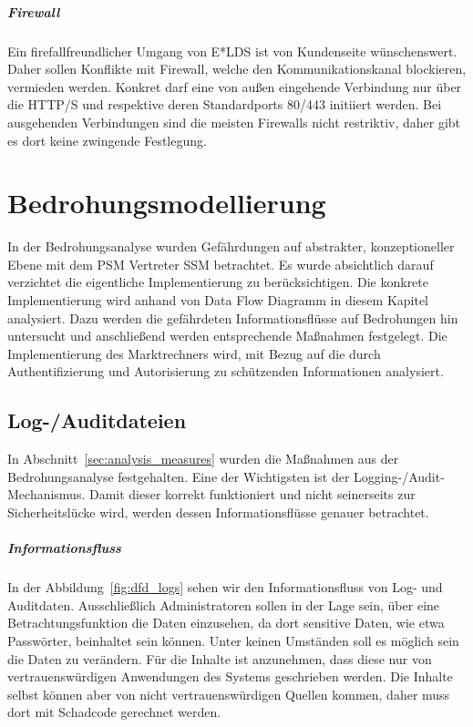 \documentclass[11pt,a4paper]{report}
\begin{document}
\paragraph{Firewall}
Ein firefallfreundlicher Umgang von E*LDS ist von Kundenseite wünschenswert. Daher sollen Konflikte mit Firewall, welche den Kommunikationskanal blockieren, vermieden werden. Konkret darf eine von außen eingehende Verbindung nur über die HTTP/S und respektive deren Standardports 80/443 initiiert werden. Bei ausgehenden Verbindungen sind die meisten Firewalls nicht restriktiv, daher gibt es dort keine zwingende Festlegung.

\chapter{Bedrohungsmodellierung} \label{chap:threat_modelling}

In der Bedrohungsanalyse wurden Gefährdungen auf abstrakter, konzeptioneller Ebene mit dem PSM Vertreter SSM betrachtet. Es wurde absichtlich darauf verzichtet die eigentliche Implementierung zu berücksichtigen. Die konkrete Implementierung wird anhand von Data Flow Diagramm in diesem Kapitel analysiert. Dazu werden die gefährdeten Informationsflüsse auf Bedrohungen hin untersucht und anschließend werden entsprechende Maßnahmen festgelegt. Die Implementierung des Marktrechners wird, mit Bezug auf die durch Authentifizierung und Autorisierung zu schützenden Informationen analysiert.

\section{Log-/Auditdateien}

In Abschnitt~\ref{sec:analysis_measures} wurden die Maßnahmen aus der Bedrohungsanalyse festgehalten. Eine der Wichtigsten ist der Logging-/Audit-Mechanismus. Damit dieser korrekt funktioniert und nicht seinerseits zur Sicherheitslücke wird, werden dessen Informationsflüsse genauer betrachtet.

\paragraph{Informationsfluss}
In der Abbildung~\ref{fig:dfd_logs} sehen wir den Informationsfluss von Log- und Auditdaten. Ausschließlich Administratoren sollen in der Lage sein, über eine  Betrachtungsfunktion die Daten einzusehen, da dort sensitive Daten, wie etwa Passwörter, beinhaltet sein können. Unter keinen Umständen soll es möglich sein die Daten zu verändern. Für die Inhalte ist anzunehmen, dass diese nur von vertrauenswürdigen Anwendungen des Systems geschrieben werden. Die Inhalte selbst können aber von nicht vertrauenswürdigen Quellen kommen, daher muss dort mit Schadcode gerechnet werden.
\end{document}
